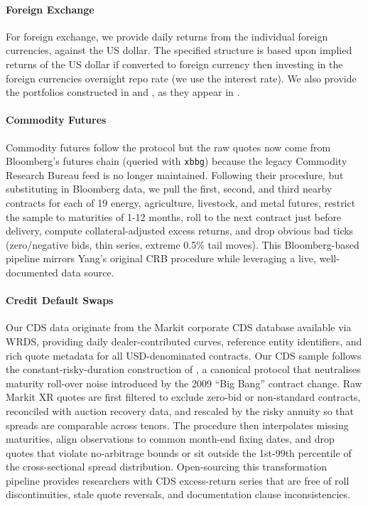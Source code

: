 \documentclass{article}
\begin{document}
\paragraph{Foreign Exchange}
For foreign exchange, we provide daily returns from the individual foreign currencies, against the US dollar. 
The specified structure is based upon implied returns of the US dollar if converted to foreign currency then investing 
in the foreign currencies overnight repo rate (we use the interest rate).
We also provide the portfolios constructed in \cite{Lettau2014} and \cite{Menkhoff2012}, as they appear in \cite{He2017}.

\paragraph{Commodity Futures}
Commodity futures follow the \cite{Yang2013} protocol but the raw quotes now
come from Bloomberg's futures chain (queried with \texttt{xbbg}) because the
legacy Commodity Research Bureau feed is no longer maintained.  Following their procedure, but substituting in Bloomberg data, we pull the
first, second, and third nearby contracts for each of 19 energy, agriculture, livestock, and
metal futures, restrict the sample to maturities of 1-12 months, roll to the
next contract just before delivery, compute collateral-adjusted excess returns,
and drop obvious bad ticks (zero/negative bids, thin series, extreme 0.5\% tail 
moves).  This Bloomberg-based pipeline mirrors Yang's original CRB procedure
while leveraging a live, well-documented data source.

\paragraph{Credit Default Swaps}
Our CDS data originate from the Markit corporate CDS database available via
WRDS, providing daily dealer-contributed curves, reference entity identifiers,
and rich quote metadata for all USD-denominated contracts. 
Our CDS sample follows the constant-risky-duration construction of
\cite{Palhares2012}, a canonical protocol that neutralises maturity roll-over
noise introduced by the 2009 ``Big Bang'' contract change. Raw Markit XR quotes
are first filtered to exclude zero-bid or non-standard contracts, reconciled
with auction recovery data, and rescaled by the risky annuity so that spreads
are comparable across tenors.  The procedure then interpolates missing
maturities, align observations to common month-end fixing dates, and drop quotes
that violate no-arbitrage bounds or sit outside the 1st-99th percentile of the
cross-sectional spread distribution. Open-sourcing this transformation pipeline
provides researchers with CDS excess-return series that are free of roll
discontinuities, stale quote reversals, and documentation clause
inconsistencies.
\end{document}
